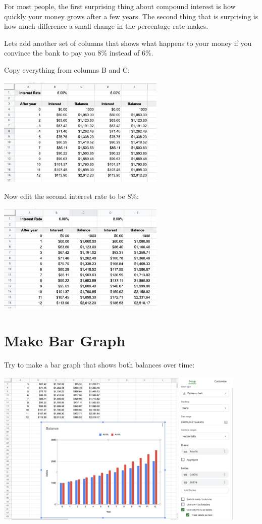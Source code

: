 For most people, the first surprising thing about compound interest is
how quickly your money grows after a few years.  The second thing that
is surprising is how much difference a small change in the percentage
rate makes.

Lets add another set of columns that shows what happens to your money
if you convince the bank to pay you 8\% instead of 6\%.

Copy everything from columns B and C:

\includegraphics[width=0.6\textwidth]{CopyForSecondInterest.png}

Now edit the second interest rate to be 8\%:

\includegraphics[width=0.6\textwidth]{AtBiggerInterestRate.png}

\section{Make Bar Graph}

Try to make a bar graph that shows both balances over time:

\includegraphics[width=0.9\textwidth]{InterestGraph.png}

